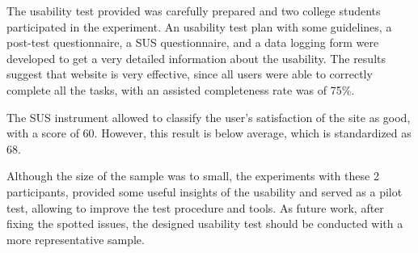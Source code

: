 \documentclass[a4paper]{article}
\begin{document}
The usability test provided was carefully prepared and two college students participated in the experiment.
An usability test plan with some guidelines, a post-test questionnaire, a SUS questionnaire, and a data logging form were developed to get a very detailed information about the usability.
The results suggest that website is very effective, since all users were able to correctly complete all the tasks, with an assisted completeness rate was of 75\%. 

The SUS instrument allowed to classify the user's satisfaction of the site as good, with a score of 60. However, this result is below average, which is standardized as 68.

Although the size of the sample was to small, the experiments with these 2 participants, provided some useful insights of the usability and served as a pilot test, allowing to improve the test procedure and tools. As future work, after fixing the spotted issues, the designed usability test should be conducted with a more representative sample.

\appendix












\end{document}
